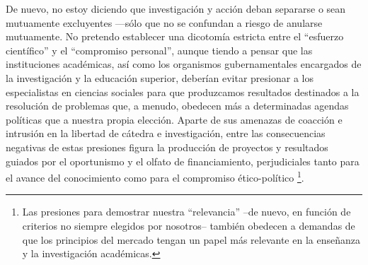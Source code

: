 \documentclass[
  spanish,
  11pt,
  a4paper,
]{scrbook}
\begin{document}
De nuevo, no estoy diciendo que investigación y acción deban separarse o
sean mutuamente excluyentes ---sólo que no se confundan a riesgo de
anularse mutuamente. No pretendo establecer una dicotomía estricta entre
el ``esfuerzo científico'' y el ``compromiso personal'', aunque tiendo a
pensar que las instituciones académicas, así como los organismos
gubernamentales encargados de la investigación y la educación superior,
deberían evitar presionar a los especialistas en ciencias sociales para
que produzcamos resultados destinados a la resolución de problemas que,
a menudo, obedecen más a determinadas agendas políticas que a nuestra
propia elección. Aparte de sus amenazas de coacción e intrusión en la
libertad de cátedra e investigación, entre las consecuencias negativas
de estas presiones figura la producción de proyectos y resultados
guiados por el oportunismo y el olfato de financiamiento, perjudiciales
tanto para el avance del conocimiento como para el compromiso
ético-político \footnote{Las presiones para demostrar nuestra
  ``relevancia'' --de nuevo, en función de criterios no siempre elegidos
  por nosotros-- también obedecen a demandas de que los principios del
  mercado tengan un papel más relevante en la enseñanza y la
  investigación académicas.}.
\end{document}
